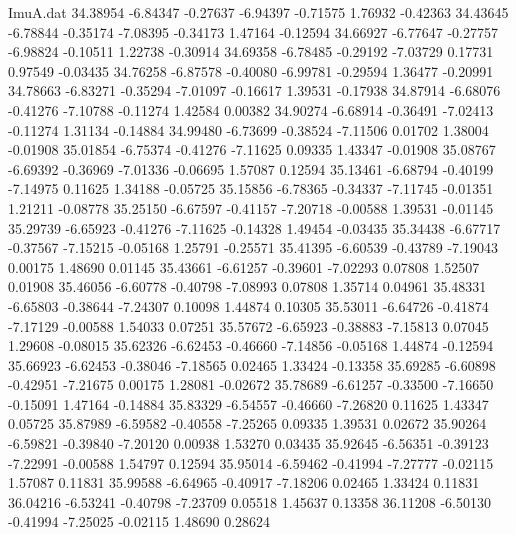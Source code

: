 \begin{filecontents}{ImuA.dat}
  34.38954   -6.84347   -0.27637   -6.94397   -0.71575    1.76932   -0.42363
  34.43645   -6.78844   -0.35174   -7.08395   -0.34173    1.47164   -0.12594
  34.66927   -6.77647   -0.27757   -6.98824   -0.10511    1.22738   -0.30914
  34.69358   -6.78485   -0.29192   -7.03729    0.17731    0.97549   -0.03435
  34.76258   -6.87578   -0.40080   -6.99781   -0.29594    1.36477   -0.20991
  34.78663   -6.83271   -0.35294   -7.01097   -0.16617    1.39531   -0.17938
  34.87914   -6.68076   -0.41276   -7.10788   -0.11274    1.42584    0.00382
  34.90274   -6.68914   -0.36491   -7.02413   -0.11274    1.31134   -0.14884
  34.99480   -6.73699   -0.38524   -7.11506    0.01702    1.38004   -0.01908
  35.01854   -6.75374   -0.41276   -7.11625    0.09335    1.43347   -0.01908
  35.08767   -6.69392   -0.36969   -7.01336   -0.06695    1.57087    0.12594
  35.13461   -6.68794   -0.40199   -7.14975    0.11625    1.34188   -0.05725
  35.15856   -6.78365   -0.34337   -7.11745   -0.01351    1.21211   -0.08778
  35.25150   -6.67597   -0.41157   -7.20718   -0.00588    1.39531   -0.01145
  35.29739   -6.65923   -0.41276   -7.11625   -0.14328    1.49454   -0.03435
  35.34438   -6.67717   -0.37567   -7.15215   -0.05168    1.25791   -0.25571
  35.41395   -6.60539   -0.43789   -7.19043    0.00175    1.48690    0.01145
  35.43661   -6.61257   -0.39601   -7.02293    0.07808    1.52507    0.01908
  35.46056   -6.60778   -0.40798   -7.08993    0.07808    1.35714    0.04961
  35.48331   -6.65803   -0.38644   -7.24307    0.10098    1.44874    0.10305
  35.53011   -6.64726   -0.41874   -7.17129   -0.00588    1.54033    0.07251
  35.57672   -6.65923   -0.38883   -7.15813    0.07045    1.29608   -0.08015
  35.62326   -6.62453   -0.46660   -7.14856   -0.05168    1.44874   -0.12594
  35.66923   -6.62453   -0.38046   -7.18565    0.02465    1.33424   -0.13358
  35.69285   -6.60898   -0.42951   -7.21675    0.00175    1.28081   -0.02672
  35.78689   -6.61257   -0.33500   -7.16650   -0.15091    1.47164   -0.14884
  35.83329   -6.54557   -0.46660   -7.26820    0.11625    1.43347    0.05725
  35.87989   -6.59582   -0.40558   -7.25265    0.09335    1.39531    0.02672
  35.90264   -6.59821   -0.39840   -7.20120    0.00938    1.53270    0.03435
  35.92645   -6.56351   -0.39123   -7.22991   -0.00588    1.54797    0.12594
  35.95014   -6.59462   -0.41994   -7.27777   -0.02115    1.57087    0.11831
  35.99588   -6.64965   -0.40917   -7.18206    0.02465    1.33424    0.11831
  36.04216   -6.53241   -0.40798   -7.23709    0.05518    1.45637    0.13358
  36.11208   -6.50130   -0.41994   -7.25025   -0.02115    1.48690    0.28624

\end{filecontents}
